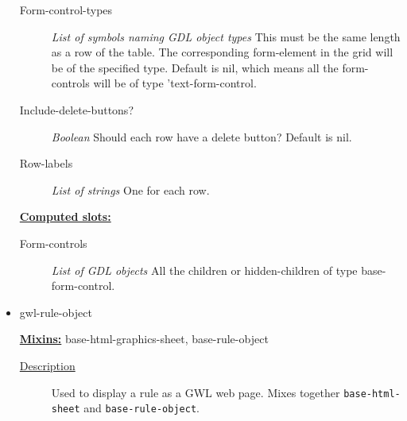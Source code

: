 \documentclass [11pt]{book}
\begin{document}
\begin{itemize}
\begin{description}
\item [Form-control-types]
\emph{List of symbols naming GDL object types} This must be
the same length as a row of the table. The corresponding
form-element in the grid will be of the specified type.
Default is nil, which means all the form-controls will
be of type 'text-form-control.


\item [Include-delete-buttons?]
\emph{Boolean} Should each row have a delete button?
Default is nil.


\item [Row-labels]
\emph{List of strings} One for each row.


\end{description}






\textbf{
\underline{Computed slots:}}

\begin{description}

\item [Form-controls]
\emph{List of GDL objects} All the children or hidden-children
of type base-form-control.


\end{description}







\item {}gwl-rule-object


\textbf{
\underline{Mixins:}} base-html-graphics-sheet, base-rule-object





\begin{description}

\item [
\underline{Description}]


Used to display a rule as a GWL web page. 
Mixes together \texttt{base-html-sheet} and \texttt{base-rule-object}.



\end{description}










\end{itemize}
\end{document}
